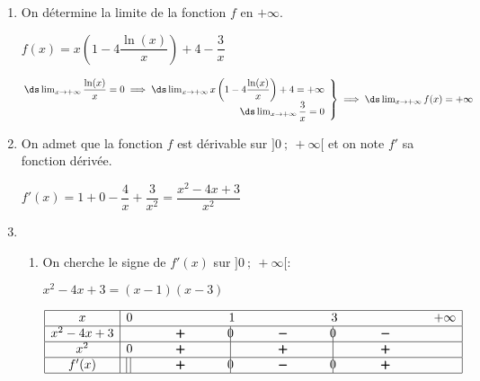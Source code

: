 \begin{enumerate}
\item On détermine la limite de la fonction $f$ en $+\infty$.

$f(x) = x\left ( 1- 4\dfrac{\ln(x)}{x}\right ) + 4 -  \dfrac{3}{x}$

$\left.
\begin{array}{@{} r}
\ds\lim_{x\to +\infty} \dfrac{\ln(x)}{x} = 0 \implies \ds\lim_{x\to +\infty}  x\left ( 1- 4\dfrac{\ln(x)}{x}\right ) + 4 = +\infty\\
\ds\lim_{x\to +\infty} \dfrac{3}{x}= 0
\end{array}
\right \rbrace
\implies
\ds\lim_{x\to +\infty} f(x) = +\infty$

\item On admet que la fonction $f$ est dérivable sur $]0~;~ +\infty[$ et on note $f'$ sa fonction dérivée.

$f'(x)= 1 + 0 - \dfrac{4}{x} +\dfrac{3}{x^2} = \dfrac{x^2 - 4x +3}{x^2}$

\item
	\begin{enumerate}
		\item %
		
%		
On cherche le signe de $f'(x)$ sur $]0~;~+\infty[$:

$x^2-4x+3 = (x-1)(x-3)$

\begin{center}
{
\renewcommand{\arraystretch}{1.5}
\def\esp{\hspace*{2cm}}
$\begin{array}{|c | l *{6}{c} |} 
\hline
x  & 0 & \esp & 1 & \esp & 3 & \esp & +\infty \\
\hline
x^2-4x+3 &  & \pmb{+} &  \vline\hspace{-2.7pt}{0} & \pmb{-} & \vline\hspace{-2.7pt}{0} & \pmb{-} &\\
\hline
x^2 & 0  & \pmb{+} &  \vline\hspace{-2.7pt}{\phantom 0} & \pmb{+} & \vline\hspace{-2.7pt}{\phantom 0} & \pmb{+} &\\
\hline
f'(x) & \vline\;\vline  & \pmb{+} &  \vline\hspace{-2.7pt}{0} & \pmb{-} & \vline\hspace{-2.7pt}{0} & \pmb{+} & \\
\hline
\end{array}$
}
\end{center}


\end{enumerate}
\end{enumerate}
